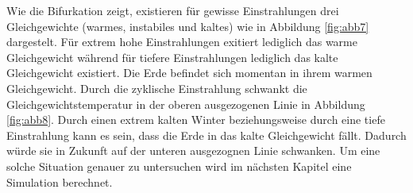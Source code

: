 \begin{refsection}
Wie die Bifurkation zeigt, existieren für gewisse Einstrahlungen drei Gleichgewichte (warmes, instabiles und kaltes) wie in Abbildung \ref{fig:abb7} dargestelt. Für extrem hohe Einstrahlungen exitiert lediglich das warme Gleichgewicht während für tiefere Einstrahlungen lediglich das kalte Gleichgewicht existiert. Die Erde befindet sich momentan in ihrem warmen Gleichgewicht. Durch die zyklische Einstrahlung schwankt die Gleichgewichtstemperatur in der oberen ausgezogenen Linie in Abbildung \ref{fig:abb8}. Durch einen extrem kalten Winter beziehungsweise durch eine tiefe Einstrahlung kann es sein, dass die Erde in das kalte Gleichgewicht fällt. Dadurch würde sie in Zukunft auf der unteren ausgezognen Linie schwanken. Um eine solche Situation genauer zu untersuchen wird im nächsten Kapitel eine Simulation berechnet. 



\end{refsection}
